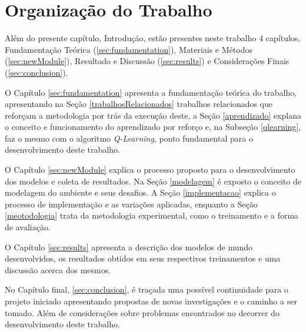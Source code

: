 \section{Organização do Trabalho}

Além do presente capítulo, Introdução, estão presentes neste trabalho 4 capítulos, Fundamentação
Teórica (\ref{sec:fundamentation}), Materiais e Métodos (\ref{sec:newModule}),
Resultado e Discussão
(\ref{sec:results}) e Considerações Finais (\ref{sec:conclusion}).

O Capítulo \ref{sec:fundamentation} apresenta a fundamentação teórica do trabalho, apresentando na Seção
\ref{trabalhosRelacionados} trabalhos relacionados que reforçam a metodologia por trás da execução
deste, a Seção \ref{aprendizado} explana o conceito e funcionamento do aprendizado por reforço e, na
Subseção \ref{qlearning}, faz o mesmo com o algoritmo \textit{Q-Learning}, ponto fundamental para o
desenvolvimento deste trabalho.

O Capítulo \ref{sec:newModule} explica o processo proposto para o desenvolvimento dos modelos e
coleta de resultados. Na Seção \ref{modelagem} é exposto o conceito de modelagem do ambiente e seus
desafios. A Seção \ref{implementacao} explica o processo de implementação e as
variações aplicadas, enquanto a Seção \ref{meotodologia} trata da metodologia
experimental, como o treinamento e a forma de avaliação.

O Capítulo \ref{sec:results} apresenta a descrição dos modelos de mundo
desenvolvidos, os resultados obtidos em seus respectivos treinamentos e uma
discussão acerca dos mesmos.

No Capítulo final, \ref{sec:conclusion}, é traçada uma possível continuidade para
o projeto iniciado apresentando propostas de novas investigações e o caminho a
ser tomado. Além de considerações sobre problemas encontrados no decorrer do
desenvolvimento deste trabalho.